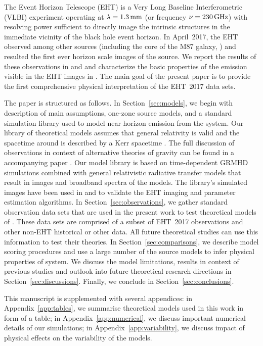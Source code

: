 The Event Horizon Telescope (EHT) is a Very Long Baseline Interferometric (VLBI) experiment operating at $\lambda = 1.3\,\mathrm{mm}$ (or frequency $\nu = 230\,\mathrm{GHz}$)
with resolving power sufficient to directly image the intrinsic \sgra structures in the immediate vicinity of the black hole event horizon.
In April~2017, the EHT observed \sgra among other sources (including the core of the M87 galaxy, ) and resulted the first ever horizon scale images of the source.
We report the results of these observations in  and  and characterize the basic properties of the emission visible in the EHT images in .
The main goal of the present paper  is to provide the first comprehensive physical interpretation of the EHT~2017 \sgra data sets.

The paper is structured as follows. In Section~\ref{sec:models}, we begin with description of main assumptions, one-zone source models, and a standard simulation library used to model near horizon emission from the \sgra system.
Our library of theoretical models assumes that general relativity is valid and the spacetime around \sgra is described by a Kerr spacetime \citep{1963PhRvL..11..237K}. The full discussion of \sgra observations in context of alternative theories of gravity can be found in a accompanying paper .
Our model library is based on time-dependent GRMHD simulations combined with general relativistic radiative transfer models that result in images and broadband spectra of the models.
The library's simulated images have been used in  and  to validate the \sgra EHT imaging and parameter estimation algorithms.
In Section~\ref{sec:observations}, we gather standard observation data sets that are used in the present work to test theoretical models of \sgra.
These data sets are comprised of a subset of EHT~2017 observations and other non-EHT historical or other data.
All future theoretical studies can use this information to test their theories. 
In Section~\ref{sec:comparisons}, we describe model scoring procedures and use a large number of the source models to infer physical properties of \sgra system.
We discuss the model limitations, results in context of previous studies and outlook into future \sgra theoretical research directions in Section~\ref{sec:discussions}.
Finally, we conclude in Section~\ref{sec:conclusions}.

This manuscript is supplemented with several appendices:
in Appendix~\ref{app:tables}, we summarise theoretical models used in this work in form of a table;
in Appendix~\ref{app:numerical}, we discuss important numerical details of our simulations;
in Appendix~\ref{app:variability}, we discuss impact of physical effects on the variability of the models.